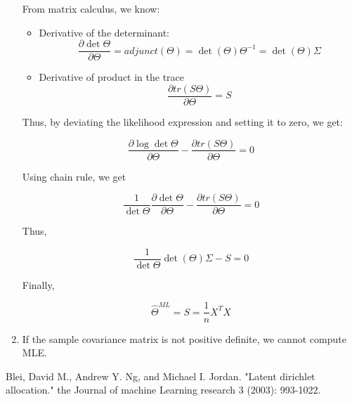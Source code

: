 \documentclass{article}
\begin{document}
\begin{enumerate}
From matrix calculus, we know:

\begin{itemize}
\item Derivative of the determinant:
\begin{equation*}
\frac{\partial\det\Theta}{\partial \Theta} = adjunct(\Theta) = \det(\Theta) \Theta^{-1} = \det(\Theta) \Sigma
\end{equation*}
\item Derivative of product in the trace 
\begin{equation*}
\frac{\partial tr(S\Theta)}{\partial \Theta} = S
\end{equation*}
\end{itemize}

Thus, by deviating the likelihood expression and setting it to zero, we get:

\begin{equation*}
\frac{\partial\log\det\Theta}{\partial \Theta} - \frac{\partial tr(S\Theta)}{\partial \Theta} = 0
\end{equation*}

Using chain rule, we get

\begin{equation*}
\frac{1}{\det\Theta}\frac{\partial\det\Theta}{\partial \Theta} - \frac{\partial tr(S\Theta)}{\partial \Theta} = 0
\end{equation*}

Thus,

\begin{equation*}
\frac{1}{\det\Theta}\det(\Theta)\Sigma - S = 0
\end{equation*}

Finally,

\begin{equation*}
\hat{\Theta}^{ML} = S = \frac{1}{n}X^TX
\end{equation*}



\item
If the sample covariance matrix is not positive definite, we cannot compute MLE.


\end{enumerate}



\begin{thebibliography}{1}

   Blei, David M., Andrew Y. Ng, and Michael I. Jordan. "Latent dirichlet allocation." the Journal of machine Learning research 3 (2003): 993-1022.


\end{thebibliography}
\end{document}
